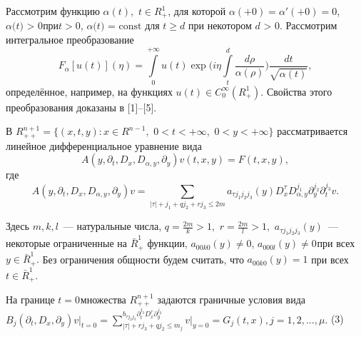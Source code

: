 




Рассмотрим функцию $\alpha (t),\,\,t \in R_ + ^1 $, для которой $\alpha ( +
0) = {\alpha }'( + 0) = 0$, $\alpha \mbox{(}t\mbox{) > 0}$при$t > 0$,
$\alpha \mbox{(}t\mbox{) = const}$ для $t \geqslant d$ при некотором $d\mbox{ >
0}$. Рассмотрим интегральное преобразование
\[
F_\alpha [u(t)](\eta ) = \int\limits_0^{ + \infty } {u(t)\exp (i\eta }
\int\limits_t^d {\frac{d\rho }{\alpha (\rho )}} )\frac{dt}{\sqrt {\alpha
(t)} },
\]
определённое, например, на функциях
$u(t) \in C_0^\infty (R_ + ^1 )$.
Свойства этого преобразования доказаны в [1]--[5].

В $R_{ + + }^{n + 1} = \{(x,t,y):x \in R^{n - 1},\,\,0 < t < + \infty ,\,\,0
< y < + \infty \}$ рассматривается линейное дифференциальное уравнение вида
\begin{equation}
\label{eq4700}
A(y,\partial _t ,D_x ,D_{\alpha ,y} ,\partial _y )v(t,x,y) = F(t,x,y),
\end{equation}
где
\begin{equation}
\label{eq4701}
A(y,\partial _t ,D_x ,D_{\alpha ,y} ,\partial _y )v = \sum\limits_{\left|
\tau \right| + j_1 + qj_2 + rj_3 \leqslant 2m} {a_{\tau j_1 j_2 j_3 } (y)D_x^\tau
D_{\alpha ,y}^{j_1 } } \partial _y^{j_2 } \partial _t^{j_3 } v.
\end{equation}



Здесь $m,k,l$~--- натуральные числа, $q = \frac{2m}{k} > 1,\,\,r = \frac{2m}{l} >
1,\,\,a_{\tau j_1 j_2 j_3 } (y)$~--- некоторые ограниченные на $\bar {R}_ + ^1
$ функции,
\linebreak
$a_{00k0} (y) \ne 0$, $a_{000l} (y) \ne 0_{ }$при всех$y \in
\bar {R}_ + ^1 .$ Без ограничения общности будем считать, что $a_{00k0} (y)
= 1$ при всех $t \in \bar {R}_ + ^1 .$

На границе $t = 0_{ }$множества $R_{ + + }^{n + 1} $ задаются граничные
условия вида$B_j (\partial _t ,D_x ,\partial _y )\left. v \right|_{t = 0} =
\sum\limits_{\left| \tau \right| + rj_3 + qj_2 \leqslant m_j }^ {b_{\tau j_2 j_3 }
\partial _t^{j_3 } D_x^\tau \partial _y^{j_2 } } \left. v \right|_{y = 0} =
G_j (t,x),j = 1,2,...,\mu .$ (3)

